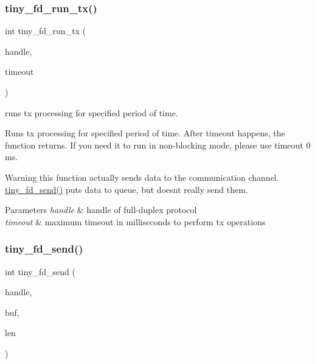 \subsubsection{\texorpdfstring{tiny\+\_\+fd\+\_\+run\+\_\+tx()}{tiny\_fd\_run\_tx()}}
{\footnotesize\ttfamily int tiny\+\_\+fd\+\_\+run\+\_\+tx (\begin{DoxyParamCaption}\item[{\hyperlink{group__FULL__DUPLEX__API_ga91e6b79431fe38570fb102701ef0b7e8}{tiny\+\_\+fd\+\_\+handle\+\_\+t}}]{handle,  }\item[{uint16\+\_\+t}]{timeout }\end{DoxyParamCaption})}



runs tx processing for specified period of time. 

Runs tx processing for specified period of time. After timeout happens, the function returns. If you need it to run in non-\/blocking mode, please use timeout 0 ms.

\begin{DoxyWarning}{Warning}
this function actually sends data to the communication channel. \hyperlink{group__FULL__DUPLEX__API_ga490157ee98ea6148f99a5bb1f26c5f60}{tiny\+\_\+fd\+\_\+send()} puts data to queue, but doesn\textquotesingle{}t really send them.
\end{DoxyWarning}

\begin{DoxyParams}{Parameters}
{\em handle} & handle of full-\/duplex protocol \\
\hline
{\em timeout} & maximum timeout in milliseconds to perform tx operations \\
\hline
\end{DoxyParams}
\mbox{\label{group__FULL__DUPLEX__API_ga490157ee98ea6148f99a5bb1f26c5f60}} 
\subsubsection{\texorpdfstring{tiny\+\_\+fd\+\_\+send()}{tiny\_fd\_send()}}
{\footnotesize\ttfamily int tiny\+\_\+fd\+\_\+send (\begin{DoxyParamCaption}\item[{\hyperlink{group__FULL__DUPLEX__API_ga91e6b79431fe38570fb102701ef0b7e8}{tiny\+\_\+fd\+\_\+handle\+\_\+t}}]{handle,  }\item[{const void $\ast$}]{buf,  }\item[{int}]{len }\end{DoxyParamCaption})}



